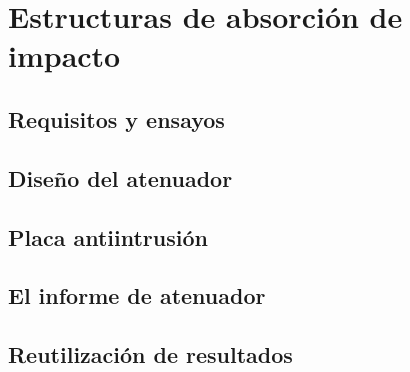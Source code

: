 \chapter{Estructuras de absorción de impacto}
\label{ch:estructuras_impacto}

\begin{objetivos}
  \item {}
  \item {}
  \item {}
\end{objetivos}


\section{Requisitos y ensayos}
\label{sec:estructuras_impacto:01}

\section{Diseño del atenuador}
\label{sec:estructuras_impacto:02}

\section{Placa antiintrusión}
\label{sec:estructuras_impacto:03}

\section{El informe de atenuador}
\label{sec:estructuras_impacto:04}

\section{Reutilización de resultados}
\label{sec:estructuras_impacto:05}


